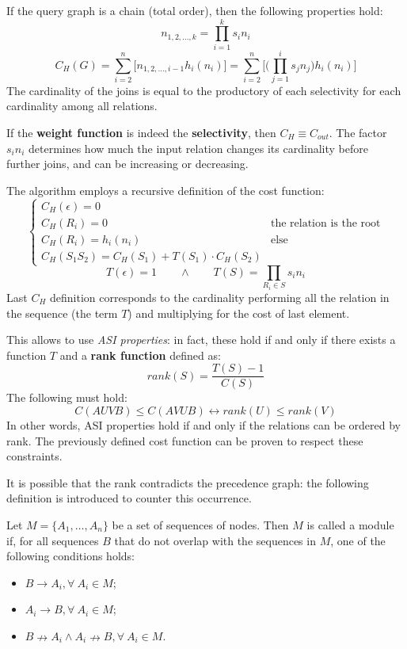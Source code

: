 If the query graph is a chain (total order), then the following properties hold:
$$n_{1, 2, \dots, k} = \prod_{i=1}^{k}s_in_i$$
$$C_H(G) = \sum_{i=2}^{n}\big[n_{1, 2, \dots, i-1}h_i(n_i)\big] = \sum_{i=2}^{n}\Big[\Big(\prod_{j=1}^{i}s_jn_j\Big)h_i(n_i)\Big]$$
The cardinality of the joins is equal to the productory of each selectivity for each cardinality among all relations.

If the \textbf{weight function} is indeed the \textbf{selectivity}, then $C_H \equiv C_{out}$. The factor $s_in_i$ determines how much the input relation changes its cardinality before further joins, and can be increasing or decreasing.

The algorithm employs a recursive definition of the cost function:
$$\begin{cases}
C_H(\epsilon) = 0 \\
C_H(R_i) = 0 & \text{the relation is the root} \\
C_H(R_i) = h_i(n_i) & \text{else} \\
C_H(S_1S_2) = C_H(S_1) + T(S_1) \cdot C_H(S_2)
\end{cases}$$
$$T(\epsilon) = 1 \qquad \land \qquad T(S) = \prod_{R_i \in S}s_in_i$$
Last $C_H$ definition corresponds to the cardinality performing all the relation in the sequence (the term $T$) and multiplying for the cost of last element.

This allows to use \textit{ASI properties}: in fact, these hold if and only if there exists a function $T$ and a \textbf{rank function} defined as:
$$rank(S) = \frac{T(S) - 1}{C(S)}$$
The following must hold:
$$C(AUVB) \leq C(AVUB) \leftrightarrow rank(U) \leq rank(V)$$
In other words, ASI properties hold if and only if the relations can be ordered by rank. The previously defined cost function can be proven to respect these constraints.

It is possible that the rank contradicts the precedence graph: the following definition is introduced to counter this occurrence.

Let $M = \{A_1, \dots, A_n\}$ be a set of sequences of nodes. Then $M$ is called a module if, for all sequences $B$ that do not overlap with the sequences in $M$, one of the following conditions holds:
\begin{itemize}
	\item $B \rightarrow A_i, \forall\ A_i \in M$;
	\item $A_i \rightarrow B, \forall\ A_i \in M$;
	\item $B \nrightarrow A_i \land A_i \nrightarrow B, \forall\ A_i \in M$.
\end{itemize}

